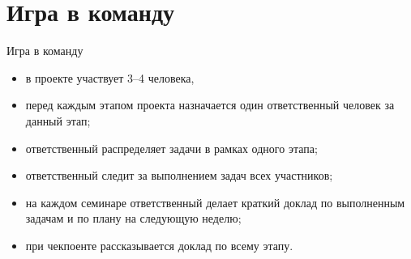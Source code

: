 \documentclass[10pt,pdf,hyperref={unicode}]{beamer}
\begin{document}
\section{Игра в команду}
\begin{frame}{Игра в команду}
\bigskip

\begin{itemize}
    \item в проекте участвует 3--4 человека,
    \item перед каждым этапом проекта назначается один ответственный человек за данный этап;
    \item ответственный распределяет задачи в рамках одного этапа;
    \item ответственный следит за выполнением задач всех участников;
    \item на каждом семинаре ответственный делает краткий доклад по выполненным задачам и по плану на следующую неделю;
    \item при чекпоенте рассказывается доклад по всему этапу.
\end{itemize}
\end{frame}
\end{document}
